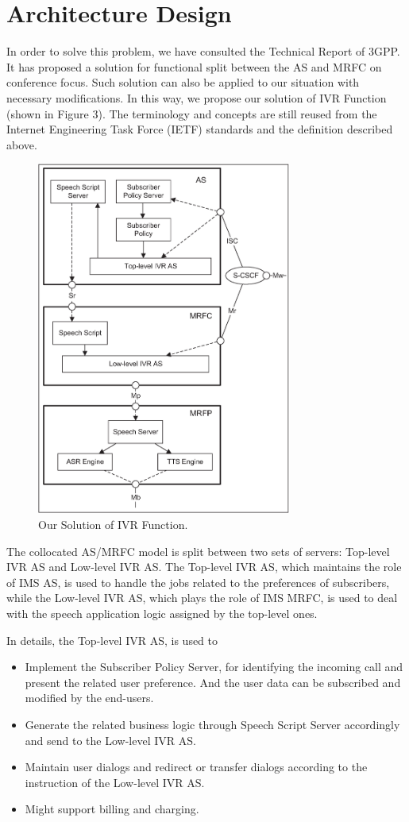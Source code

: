 \documentclass[10pt, conference, a4paper]{IEEEtran}
\begin{document}
\section{Architecture Design}

In order to solve this problem, we have consulted the Technical Report of 3GPP\cite{standard:3gpp.24.880}. It has proposed a solution for functional split between the AS and MRFC on conference focus. Such solution can also be applied to our situation with necessary modifications. In this way, we propose our solution of IVR Function (shown in Figure 3). The terminology and concepts are still reused from the Internet Engineering Task Force (IETF) standards and the definition described above.

\begin{figure}[!t]
\centering
\includegraphics[width=3.3in]{split.eps}
\caption{Our Solution of IVR Function.}
\end{figure}

The collocated AS/MRFC model is split between two sets of servers: Top-level IVR AS and Low-level IVR AS. The Top-level IVR AS, which maintains the role of IMS AS, is used to handle the jobs related to the preferences of subscribers, while the Low-level IVR AS, which plays the role of IMS MRFC, is used to deal with the speech application logic assigned by the top-level ones.

In details, the Top-level IVR AS, is used to
\begin{itemize}
\item Implement the Subscriber Policy Server, for identifying the incoming call and present the related user preference. And the user data can be subscribed and modified by the end-users.
\item Generate the related business logic through Speech Script Server accordingly and send to the Low-level IVR AS.
\item Maintain user dialogs and redirect or transfer dialogs according to the instruction of the Low-level IVR AS.
\item Might support billing and charging.
\end{itemize}
\end{document}
